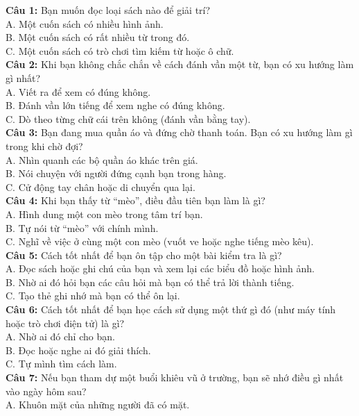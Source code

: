 \begin{multicols}{2}
\noindent
\textbf{Câu 1:} Bạn muốn đọc loại sách nào để giải trí? \\
A. Một cuốn sách có nhiều hình ảnh. \\
B. Một cuốn sách có rất nhiều từ trong đó. \\
C. Một cuốn sách có trò chơi tìm kiếm từ hoặc ô chữ. \\
\textbf{Câu 2:} Khi bạn không chắc chắn về cách đánh vần một từ, bạn có xu hướng làm gì nhất? \\
A. Viết ra để xem có đúng không. \\
B. Đánh vần lớn tiếng để xem nghe có đúng không. \\
C. Dò theo từng chữ cái trên không (đánh vần bằng tay). \\
\textbf{Câu 3:} Bạn đang mua quần áo và đứng chờ thanh toán. Bạn có xu hướng làm gì trong khi chờ đợi? \\
A. Nhìn quanh các bộ quần áo khác trên giá. \\
B. Nói chuyện với người đứng cạnh bạn trong hàng. \\
C. Cử động tay chân hoặc di chuyển qua lại. \\
\textbf{Câu 4:} Khi bạn thấy từ ``mèo'', điều đầu tiên bạn làm là gì? \\
A. Hình dung một con mèo trong tâm trí bạn. \\
B. Tự nói từ ``mèo'' với chính mình. \\
C. Nghĩ về việc ở cùng một con mèo (vuốt ve hoặc nghe tiếng mèo kêu). \\
\textbf{Câu 5:} Cách tốt nhất để bạn ôn tập cho một bài kiểm tra là gì? \\
A. Đọc sách hoặc ghi chú của bạn và xem lại các biểu đồ hoặc hình ảnh. \\
B. Nhờ ai đó hỏi bạn các câu hỏi mà bạn có thể trả lời thành tiếng. \\
C. Tạo thẻ ghi nhớ mà bạn có thể ôn lại. \\
\textbf{Câu 6:} Cách tốt nhất để bạn học cách sử dụng một thứ gì đó (như máy tính hoặc trò chơi điện tử) là gì? \\
A. Nhờ ai đó chỉ cho bạn. \\
B. Đọc hoặc nghe ai đó giải thích. \\
C. Tự mình tìm cách làm. \\
\textbf{Câu 7:} Nếu bạn tham dự một buổi khiêu vũ ở trường, bạn sẽ nhớ điều gì nhất vào ngày hôm sau? \\
A. Khuôn mặt của những người đã có mặt. \\

\end{multicols}
